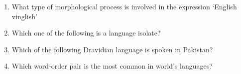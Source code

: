 \documentclass[12pt]{article}
\theoremstyle{remark}
\begin{document}
\begin{enumerate}
\begin{enumerate}
 \end{enumerate}
\hfill{}
\item What type of morphological process is involved in the expression ‘English vinglish’
\begin{enumerate}  \end{enumerate}
\hfill{}
\item Which one of the following is a language isolate?
\begin{enumerate}  \end{enumerate}
\hfill{}
\item Which of the following Dravidian language is spoken in Pakistan?
\begin{enumerate}  \end{enumerate}
\hfill{}
\item Which word-order pair is the most common in world’s languages?
\begin{enumerate} 
\end{enumerate}
\end{enumerate}
\end{document}
